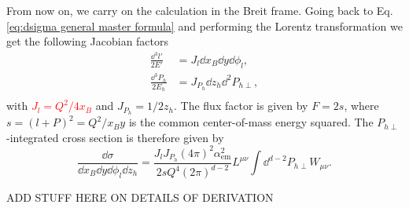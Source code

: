 From now on, we carry on the calculation in the Breit frame. Going back to Eq. \eqref{eq:dsigma general master formula} and performing the Lorentz transformation we get the following Jacobian factors
\begin{equation}
    \begin{aligned}
        \frac{\dd^{3}l'}{2E'}&=J_l\dd x_B \dd y \dd \phi_l,\\
        \frac{\dd^{3}P_h}{2E_h}&=J_{P_h}\dd z_h \dd^{2}P_{h\perp},\\
    \end{aligned}
\end{equation}  
with \textcolor{red}{$J_l=Q^2/4x_B$} and $J_{P_h}=1/2z_h$. The flux factor is given by $F=2s$, where $s=(l+P)^2=Q^2/x_B y$ is the common center-of-mass energy squared. The $P_{h\perp}$-integrated cross section is therefore given by
\begin{equation}
    \frac{\dd \sigma}{\dd x_B \dd y \dd \phi_l\dd z_h } = \frac{ J_lJ_{P_h}(4\pi)^2\alpha_{\text{em}}^2}{2sQ^4(2\pi)^{d-2}}L^{\mu\nu} \int\dd^{d-2}P_{h\perp} W_{\mu\nu}.
\end{equation}

ADD STUFF HERE ON DETAILS OF DERIVATION



